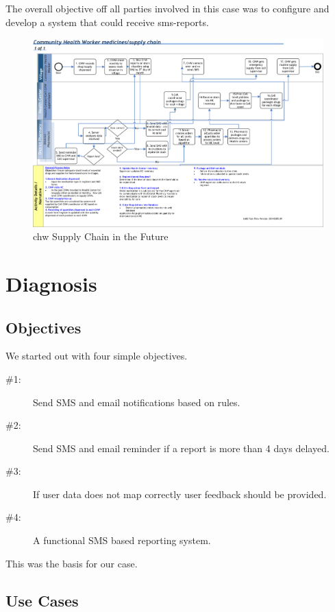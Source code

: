 The overall objective off all parties involved in this case was to configure and develop a system that could receive \gls{sms}-reports. 

\begin{figure}
\centering
\includegraphics[width=\textwidth]{case/img/chwSupplyChainFuture}
\caption{\gls{chw} Supply Chain in the Future}
\label{chwSupplyChainPresent}
\end{figure}

\section{Diagnosis}

\subsection{Objectives}
We started out with four simple objectives. 

\begin{description}
\item[\#1:] Send SMS and email notifications based on rules.
\item[\#2:] Send SMS and email reminder if a report is more than 4 days delayed.
\item[\#3:] If user data does not map correctly user feedback should be provided.
\item[\#4:] A functional SMS based reporting system.
\end{description}

This was the basis for our case.

\subsection{Use Cases}

